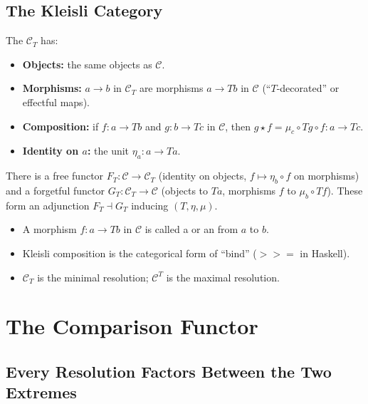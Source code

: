 \subsection{The Kleisli Category}

The  $\mathcal{C}_T$ has:
\begin{itemize}
  \item \textbf{Objects:} the same objects as $\mathcal{C}$.
  \item \textbf{Morphisms:} $a \to b$ in $\mathcal{C}_T$ are morphisms
        $a \to Tb$ in $\mathcal{C}$ (``$T$-decorated'' or effectful maps).
  \item \textbf{Composition:} if $f : a \to Tb$ and $g : b \to Tc$ in
        $\mathcal{C}$, then $g \star f = \mu_c \circ Tg \circ f : a \to Tc$.
  \item \textbf{Identity on $a$:} the unit $\eta_a : a \to Ta$.
\end{itemize}
There is a free functor $F_T : \mathcal{C} \to \mathcal{C}_T$ (identity
on objects, $f \mapsto \eta_b \circ f$ on morphisms) and a forgetful
functor $G_T : \mathcal{C}_T \to \mathcal{C}$ (objects to $Ta$, morphisms
$f$ to $\mu_b \circ Tf$). These form an adjunction $F_T \dashv G_T$
inducing $(T,\eta,\mu)$.

\begin{howtosay}
\begin{itemize}
  \item A morphism $f : a \to Tb$ in $\mathcal{C}$ is called a
         or an  from $a$
        to $b$.
  \item Kleisli composition is the categorical form of ``bind'' ($>>=$ in
        Haskell).
  \item $\mathcal{C}_T$ is the minimal resolution; $\mathcal{C}^T$ is the
        maximal resolution.
\end{itemize}
\end{howtosay}


\section{The Comparison Functor}
\label{sec:comparison-functor}

\subsection{Every Resolution Factors Between the Two Extremes}

